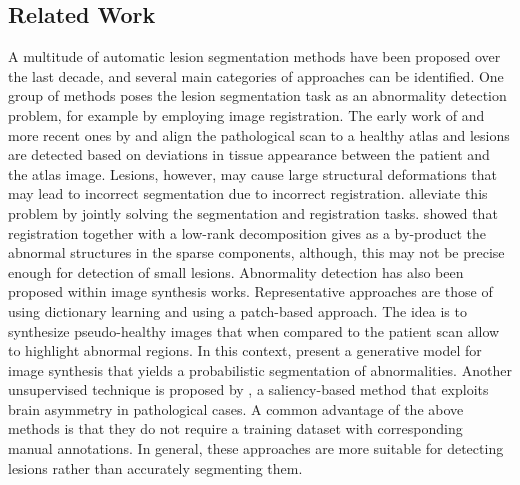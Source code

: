 

\subsection{Related Work}

A multitude of automatic lesion segmentation methods have been proposed over the last decade, and several main categories of approaches can be identified. One group of methods poses the lesion segmentation task as an abnormality detection problem, for example by employing image registration. The early work of \cite{Prastawa2004} and more recent ones by \cite{Schmidt2012} and \cite{doyle2013Brats} align the pathological scan to a healthy atlas and lesions are detected based on deviations in tissue appearance between the patient and the atlas image. Lesions, however, may cause large structural deformations that may lead to incorrect segmentation due to incorrect registration. \cite{Gooya2011,Parisot2012} alleviate this problem by jointly solving the segmentation and registration tasks. \cite{Liu2014} showed that registration together with a low-rank decomposition gives as a by-product the abnormal structures in the sparse components, although, this may not be precise enough for detection of small lesions. Abnormality detection has also been proposed within image synthesis works. Representative approaches are those of \cite{Weiss2013} using dictionary learning and \cite{Ye2013a} using a patch-based approach. The idea is to synthesize pseudo-healthy images that when compared to the patient scan allow to highlight abnormal regions. In this context, \cite{cardoso15} present a generative model for image synthesis that yields a probabilistic segmentation of abnormalities. Another unsupervised technique is proposed by \cite{Erihov2015}, a saliency-based method that exploits brain asymmetry in pathological cases. A common advantage of the above methods is that they do not require a training dataset with corresponding manual annotations. In general, these approaches are more suitable for detecting lesions rather than accurately segmenting them.

